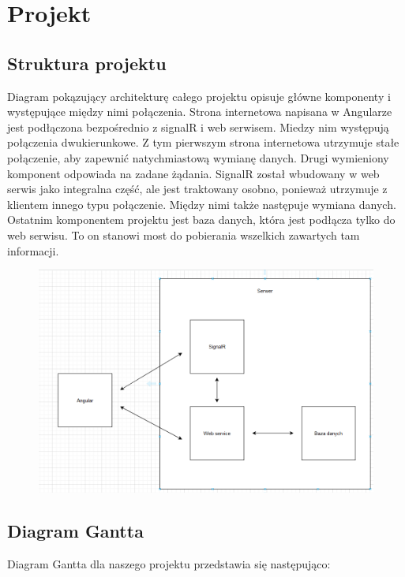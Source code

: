 \documentclass[12pt,a4paper]{article}
\begin{document}
\section{Projekt}

\subsection{Struktura projektu} %

Diagram pokązujący architekturę całego projektu opisuje główne komponenty i występujące między nimi połączenia. Strona internetowa napisana w Angularze jest podłączona bezpośrednio z signalR i web serwisem. Miedzy nim występują połączenia dwukierunkowe. Z tym pierwszym strona internetowa utrzymuje stałe połączenie, aby zapewnić natychmiastową wymianę danych. Drugi wymieniony komponent odpowiada na zadane żądania. SignalR został wbudowany w web serwis jako integralna część, ale jest traktowany osobno, ponieważ utrzymuje z klientem innego typu połączenie. Między nimi także następuje wymiana danych. Ostatnim komponentem projektu jest baza danych, która jest podłącza tylko do web serwisu. To on stanowi most do pobierania wszelkich zawartych tam informacji. 

\begin{figure}[h]
	\centering
	\includegraphics[width=0.7\linewidth]{diagramProjektu}
	\caption{}
	\label{fig:diagramprojektu}
\end{figure}
			
\subsection{Diagram Gantta}				%

\hspace*{0.7cm} Diagram Gantta dla naszego projektu przedstawia się następująco:
\end{document}

